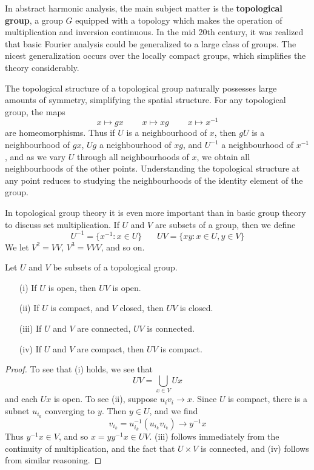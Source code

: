 In abstract harmonic analysis, the main subject matter is the {\bf topological group}, a group $G$ equipped with a topology which makes the operation of multiplication and inversion continuous. In the mid 20th century, it was realized that basic Fourier analysis could be generalized to a large class of groups. The nicest generalization occurs over the locally compact groups, which simplifies the theory considerably.

The topological structure of a topological group naturally possesses large amounts of symmetry, simplifying the spatial structure. For any topological group, the maps
%
\[ x \mapsto gx\ \ \ \ \ \ \ \ \ \ x \mapsto xg\ \ \ \ \ \ \ \ \ \ x \mapsto x^{-1} \]
%
are homeomorphisms. Thus if $U$ is a neighbourhood of $x$, then $gU$ is a neighbourhood of $gx$, $Ug$ a neighbourhood of $xg$, and $U^{-1}$ a neighbourhood of $x^{-1}$, and as we vary $U$ through all neighbourhoods of $x$, we obtain all neighbourhoods of the other points. Understanding the topological structure at any point reduces to studying the neighbourhoods of the identity element of the group.

In topological group theory it is even more important than in basic group theory to discuss set multiplication. If $U$ and $V$ are subsets of a group, then we define
%
\[ U^{-1} = \{ x^{-1} : x \in U \}\ \ \ \ \ \ \ \ UV = \{ xy: x \in U, y \in V \} \]
%
We let $V^2 = VV$, $V^3 = VVV$, and so on.

\begin{theorem}
    Let $U$ and $V$ be subsets of a topological group.
    \begin{enumerate}
        \item[(i)] If $U$ is open, then $UV$ is open.
        \item[(ii)] If $U$ is compact, and $V$ closed, then $UV$ is closed.
        \item[(iii)] If $U$ and $V$ are connected, $UV$ is connected.
        \item[(iv)] If $U$ and $V$ are compact, then $UV$ is compact.
    \end{enumerate}
\end{theorem}
\begin{proof}
    To see that (i) holds, we see that
    \[ UV = \bigcup_{x \in V} Ux \]
    and each $Ux$ is open. To see (ii), suppose $u_i v_i \to x$. Since $U$ is compact, there is a subnet $u_{i_k}$ converging to $y$. Then $y \in U$, and we find
    \[ v_{i_k} = u_{i_k}^{-1} ( u_{i_k} v_{i_k} ) \to y^{-1} x \]
    Thus $y^{-1} x \in V$, and so $x = y y^{-1} x \in UV$. (iii) follows immediately from the continuity of multiplication, and the fact that $U \times V$ is connected, and (iv) follows from similar reasoning.
\end{proof}

